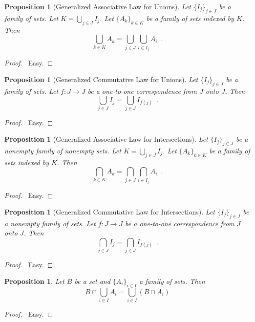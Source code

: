\documentclass{report}
\let\qed\relax
\newtheorem{prop}[ax]{Proposition}
\theoremstyle{definition}
\begin{document}
\begin{prop}[Generalized Associative Law for Unions]
Let $\{I_j\}_{j \in J}$ be a family of sets. Let $K = \bigcup_{j \in J} I_j$. Let $\{A_k\}_{k \in K}$ be a family of sets indexed by $K$. Then
\[ \bigcup_{k \in K} A_k = \bigcup_{j \in J} \bigcup_{i \in I_j} A_i \enspace . \]
\end{prop}

\begin{proof}
\pf\ Easy. \qed
\end{proof}

\begin{prop}[Generalized Commutative Law for Unions]
Let $\{I_j\}_{j \in J}$ be a family of sets. Let $f : J \rightarrow J$ be a one-to-one correspondence from $J$ onto $J$. Then
\[ \bigcup_{j \in J} I_j = \bigcup_{j \in J} I_{f(j)} \enspace . \]
\end{prop}

\begin{proof}
\pf\ Easy. \qed
\end{proof}

\begin{prop}[Generalized Associative Law for Intersections]
Let $\{I_j\}_{j \in J}$ be a nonempty family of nonempty sets. Let $K = \bigcup_{j \in J} I_j$. Let $\{A_k\}_{k \in K}$ be a family of sets indexed by $K$. Then
\[ \bigcap_{k \in K} A_k = \bigcap_{j \in J} \bigcap_{i \in I_j} A_i \enspace . \]
\end{prop}

\begin{proof}
\pf\ Easy. \qed
\end{proof}

\begin{prop}[Generalized Commutative Law for Intersections]
Let $\{I_j\}_{j \in J}$ be a nonempty family of sets. Let $f : J \rightarrow J$ be a one-to-one correspondence from $J$ onto $J$. Then
\[ \bigcap_{j \in J} I_j = \bigcap_{j \in J} I_{f(j)} \enspace . \]
\end{prop}

\begin{proof}
\pf\ Easy. \qed
\end{proof}

\begin{prop}
Let $B$ be a set and $\{A_i\}_{i \in I}$ a family of sets. Then
\[ B \cap \bigcup_{i \in I} A_i = \bigcup_{i \in I}
 (B \cap A_i) \]
\end{prop}

\begin{proof}
\pf\ Easy. \qed
\end{proof}
\end{document}
